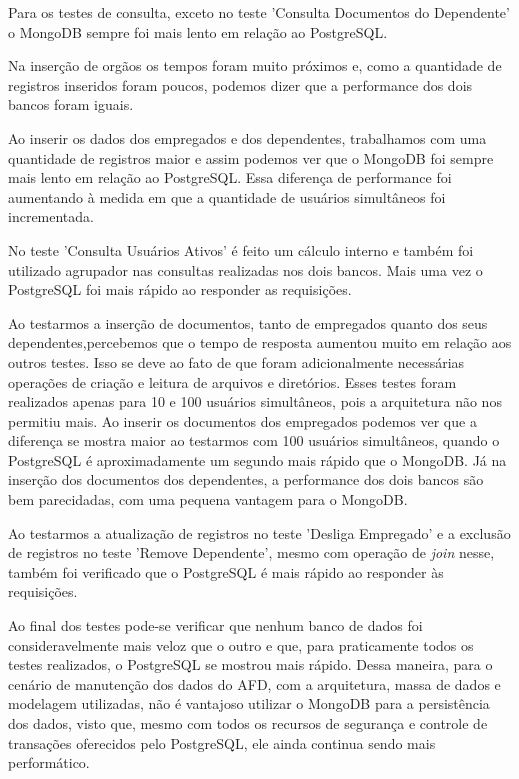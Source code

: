 Para os testes de consulta, exceto no teste 'Consulta Documentos do Dependente' o MongoDB sempre foi mais lento em relação ao PostgreSQL.

Na inserção de orgãos os tempos foram muito próximos e, como a quantidade de registros inseridos foram poucos, podemos dizer que a performance dos dois bancos foram iguais.

Ao inserir os dados dos empregados e dos dependentes, trabalhamos com uma quantidade de registros maior e assim podemos ver que o MongoDB foi sempre mais lento em relação ao PostgreSQL. Essa diferença de performance foi aumentando à medida em que a quantidade de usuários simultâneos foi incrementada.

No teste 'Consulta Usuários Ativos' é feito um cálculo interno e também foi utilizado agrupador nas consultas realizadas nos dois bancos. Mais uma vez o PostgreSQL foi mais rápido ao responder as requisições.

Ao testarmos a inserção de documentos, tanto de empregados quanto dos seus dependentes,percebemos que o tempo de resposta aumentou muito em relação aos outros testes. Isso se deve ao fato de que foram adicionalmente necessárias operações de criação e leitura de arquivos e diretórios. Esses testes foram realizados apenas para 10 e 100 usuários simultâneos, pois a arquitetura não nos permitiu mais. Ao inserir os documentos dos empregados podemos ver que a diferença se mostra maior ao testarmos com 100 usuários simultâneos, quando o PostgreSQL é aproximadamente um segundo mais rápido que o MongoDB. Já na inserção dos documentos dos dependentes, a performance dos dois bancos são bem parecidadas, com uma pequena vantagem para o MongoDB.

Ao testarmos a atualização de registros no teste 'Desliga Empregado' e a exclusão de registros no teste 'Remove Dependente', mesmo com operação de \textit{join} nesse, também foi verificado que o PostgreSQL é mais rápido ao responder às requisições.

Ao final dos testes pode-se verificar que nenhum banco de dados foi consideravelmente mais veloz que o outro e que, para praticamente todos os testes realizados, o PostgreSQL se mostrou mais rápido. Dessa maneira, para o cenário de manutenção dos dados do AFD, com a arquitetura, massa de dados e modelagem utilizadas, não é vantajoso utilizar o MongoDB para a persistência dos dados, visto que, mesmo com todos os recursos de segurança e controle de transações oferecidos pelo PostgreSQL, ele ainda continua sendo mais performático.



